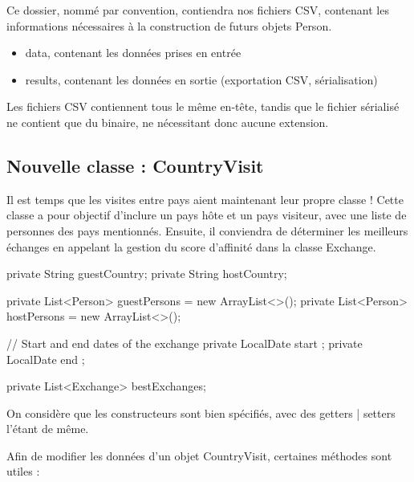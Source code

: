 \documentclass{mytex}
\begin{document}
Ce dossier, nommé par convention, contiendra nos fichiers CSV, contenant les informations nécessaires à la construction de futurs objets Person.


\begin{itemize}
	\item data, contenant les données prises en entrée
	\item results, contenant les données en sortie (exportation CSV, sérialisation)
\end{itemize}

Les fichiers CSV contiennent tous le même en-tête, tandis que le fichier sérialisé ne contient que du binaire, ne nécessitant donc aucune extension.


\subsection{Nouvelle classe : CountryVisit}

Il est temps que les visites entre pays aient maintenant leur propre classe !
Cette classe a pour objectif d'inclure un pays hôte et un pays visiteur, avec une liste de personnes des pays mentionnés. Ensuite, il conviendra de déterminer les meilleurs échanges en appelant la gestion du score d'affinité dans la classe Exchange.


\begin{codebox}
private String guestCountry;
private String hostCountry;

private List<Person> guestPersons = new ArrayList<>();
private List<Person> hostPersons = new ArrayList<>();

// Start and end dates of the exchange
private LocalDate start ;
private LocalDate end ;

private List<Exchange> bestExchanges;
\end{codebox}

On considère que les constructeurs sont bien spécifiés, avec des getters | setters l'étant de même.


Afin de modifier les données d'un objet CountryVisit, certaines méthodes sont utiles :
\end{document}
